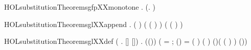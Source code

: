 \newcommand{\HOLsubstitutionTheoremsgfXXunion}{\UseVerbatim{HOLsubstitutionTheoremsgfXXunion}}
\begin{SaveVerbatim}{HOLsubstitutionTheoremsgfpXXmonotone}
\HOLTokenTurnstile{} \HOLSymConst{\HOLTokenForall{}} . (\HOLSymConst{\HOLTokenForall{}}.   \HOLConst{\HOLTokenSubset{}}  ) \HOLSymConst{\HOLTokenImp{}}   \HOLConst{\HOLTokenSubset{}}  
\end{SaveVerbatim}
\newcommand{\HOLsubstitutionTheoremsgfpXXmonotone}{\UseVerbatim{HOLsubstitutionTheoremsgfpXXmonotone}}
\begin{SaveVerbatim}{HOLsubstitutionTheoremsglXXappend}
\HOLTokenTurnstile{} \HOLSymConst{\HOLTokenForall{}}   .
      ( \HOLSymConst{++} )   \HOLSymConst{=}
       ( (   ) ) ( (   ) ) \HOLSymConst{++}    
\end{SaveVerbatim}
\newcommand{\HOLsubstitutionTheoremsglXXappend}{\UseVerbatim{HOLsubstitutionTheoremsglXXappend}}
\begin{SaveVerbatim}{HOLsubstitutionTheoremsglXXdef}
\HOLTokenTurnstile{} (\HOLSymConst{\HOLTokenForall{}} .  []   \HOLSymConst{=} []) \HOLSymConst{\HOLTokenConj{}}
   \HOLSymConst{\HOLTokenForall{}}    .
      ((\HOLSymConst{,})\HOLSymConst{::})   \HOLSymConst{=}
     (
         =     ;
        (\HOLSymConst{,}) = (  \HOLSymConst{,}  )
          \HOLConst{\HOLTokenNotIn{}}  \HOLSymConst{\HOLTokenDisj{}} ( \HOLSymConst{=} )  
           \HOLSymConst{=}  
          (\HOLSymConst{,})\HOLSymConst{::}(\HOLSymConst{,} (  ) )\HOLSymConst{::}
         (\HOLSymConst{,})\HOLSymConst{::})
\end{SaveVerbatim}
